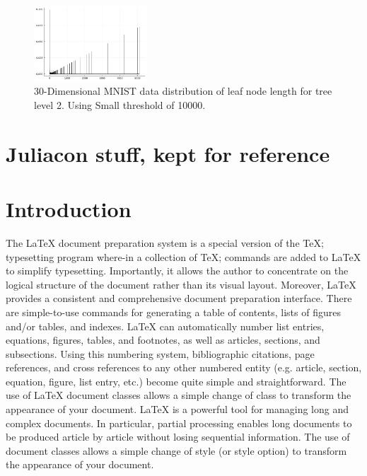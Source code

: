 \documentclass{juliacon}
\begin{document}
\begin{figure}[!ht]
  \centerline{
    \includegraphics[width=10pc]{figures/experiments/mnist_30/hist_3.png}
  }

  \caption{
    30-Dimensional MNIST data distribution of leaf node length for tree level
    2. Using Small threshold of 10000.
  }
  \label{mnist-30-hist-th}
\end{figure}

\pagebreak
\section{Juliacon stuff, kept for reference}
\section{Introduction}

The \LaTeX{} document preparation system is a special version of the
\TeX; typesetting program where-in a collection of \TeX; commands
are added to \LaTeX{} to simplify typesetting. Importantly, it allows
the author to concentrate on the logical structure of the document
rather than its visual layout.\vskip 6pt
Moreover, \LaTeX{} provides a consistent and comprehensive document
preparation interface. There are simple-to-use commands for
generating a table of contents, lists of figures and/or tables, and indexes.
\LaTeX{} can automatically number list entries, equations, figures,
tables, and footnotes, as well as articles, sections, and subsections.
Using this numbering system, bibliographic citations, page
references, and cross references to any other numbered entity (e.g.
article, section, equation, figure, list entry, etc.) become quite simple
and straightforward. The use of \LaTeX{} document classes allows
a simple change of class to transform the appearance of your document.\vskip 6pt
\LaTeX{} is a powerful tool for managing long and complex documents.
In particular, partial processing enables long documents to
be produced article by article without losing sequential information.
The use of document classes allows a simple change of style
(or style option) to transform the appearance of your document.
\end{document}
